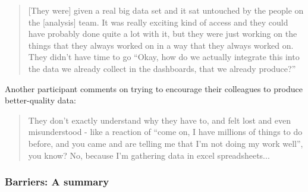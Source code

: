 \documentclass{CUP-JNL-DAP}%
\begin{document}
\blockquote{[They were] given a real big data set and it sat untouched by the people on the [analysis] team. It was really exciting kind of access and they could have probably done quite a lot with it, but they were just working on the things that they always worked on in a way that they always worked on. They didn't have time to go \enquote{Okay, how do we actually integrate this into the data we already collect in the dashboards, that we already produce?}}

Another participant comments on trying to encourage their colleagues to produce better-quality data: 

\blockquote{They don't exactly understand why they have to, and felt lost and even misunderstood - like a reaction of \enquote{come on, I have millions of things to do before, and you came and are telling me that I'm not doing my work well}, you know? No, because I'm gathering data in excel spreadsheets...}

\subsubsection{Barriers: A summary}
\end{document}
